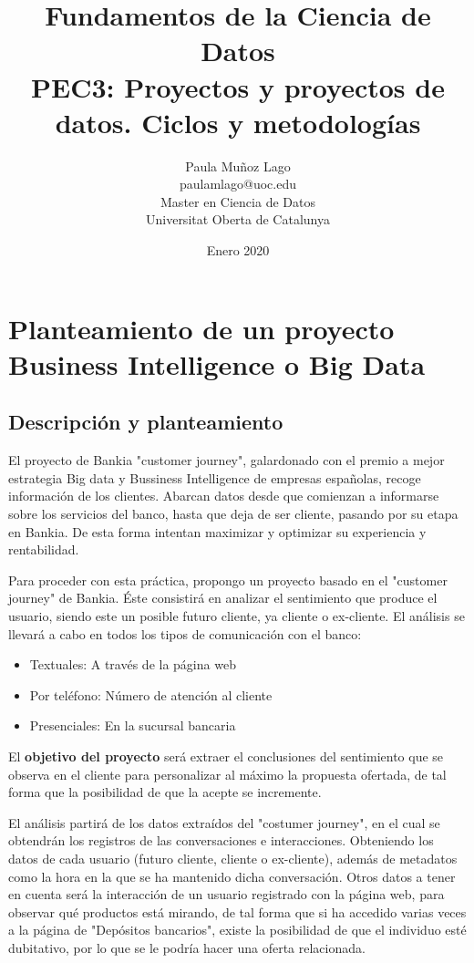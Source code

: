 \documentclass{article}
\title{Fundamentos de la Ciencia de Datos \\ PEC3: Proyectos y proyectos de datos. Ciclos y metodologías}
\author{Paula Muñoz Lago \\ paulamlago@uoc.edu \\ Master en Ciencia de Datos \\ Universitat Oberta de Catalunya}
\date{Enero 2020}
\begin{document}
\maketitle


\section{Planteamiento de un proyecto Business Intelligence o Big Data}

\subsection{Descripción y planteamiento}
El proyecto de Bankia "customer journey", galardonado con el premio a mejor estrategia Big data y Bussiness Intelligence de empresas españolas, recoge información de los clientes. Abarcan datos desde que comienzan a informarse sobre los servicios del banco, hasta que deja de ser cliente, pasando por su etapa en Bankia. De esta forma intentan maximizar y optimizar su experiencia y rentabilidad.

Para proceder con esta práctica, propongo un proyecto basado en el "customer journey" de Bankia. Éste consistirá en analizar el sentimiento que produce el usuario, siendo este un posible futuro cliente, ya cliente o ex-cliente. El análisis se llevará a cabo en todos los tipos de comunicación con el banco: 
\begin{itemize}
	\item Textuales: A través de la página web
	\item Por teléfono: Número de atención al cliente
	\item Presenciales: En la sucursal bancaria
\end{itemize}

El \textbf{objetivo del proyecto} será extraer el conclusiones del sentimiento que se observa en el cliente para personalizar al máximo la propuesta ofertada, de tal forma que la posibilidad de que la acepte se incremente. 

El análisis partirá de los datos extraídos del "costumer journey", en el cual se obtendrán los registros de las conversaciones e interacciones. Obteniendo los datos de cada usuario (futuro cliente, cliente o ex-cliente), además de metadatos como la hora en la que se ha mantenido dicha conversación. Otros datos a tener en cuenta será la interacción de un usuario registrado con la página web, para observar qué productos está mirando, de tal forma que si ha accedido varias veces a la página de "Depósitos bancarios", existe la posibilidad de que el individuo esté dubitativo, por lo que se le podría hacer una oferta relacionada.
\end{document}
